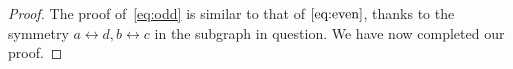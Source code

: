 \begin{proof}
 The proof of~\eqref{eq:odd} is similar to that of $\eqref{eq:even}$,
 thanks to the symmetry $a\leftrightarrow d, b\leftrightarrow c$ in
 the subgraph in question. We have now completed our proof. 
 \end{proof}
